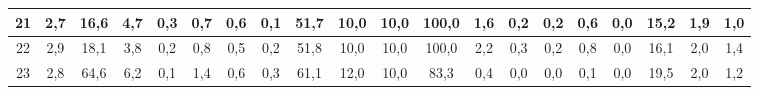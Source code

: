 \begin{sidewaystable}[]
\begin{tabular}{|c|c|c|c|c|c|c|c|c|c|c|c|c|c|c|c|c|c|c|c|}
    21 & 2,7                                              & 16,6                                             & 4,7                                              & 0,3                                              & 0,7                                              & 0,6                                              & 0,1                                              & 51,7                                            & 10,0                                            & 10,0                                            & 100,0                                           & 1,6                                             & 0,2                                             & 0,2                                             & 0,6                                             & 0,0                                             & 15,2                                             & 1,9                                              & 1,0                                              \\ \hline
    22 & 2,9                                              & 18,1                                             & 3,8                                              & 0,2                                              & 0,8                                              & 0,5                                              & 0,2                                              & 51,8                                            & 10,0                                            & 10,0                                            & 100,0                                           & 2,2                                             & 0,3                                             & 0,2                                             & 0,8                                             & 0,0                                             & 16,1                                             & 2,0                                              & 1,4                                              \\ \hline
    23 & 2,8                                              & 64,6                                             & 6,2                                              & 0,1                                              & 1,4                                              & 0,6                                              & 0,3                                              & 61,1                                            & 12,0                                            & 10,0                                            & 83,3                                            & 0,4                                             & 0,0                                             & 0,0                                             & 0,1                                             & 0,0                                             & 19,5                                             & 2,0                                              & 1,2                                              \\ \hline

\end{tabular}
\end{sidewaystable}
